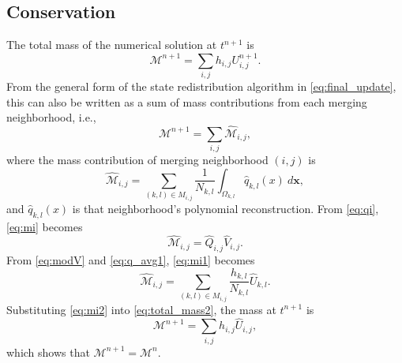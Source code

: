 \subsection{Conservation}\label{sec:cons}
The total mass of the numerical solution at $t^{n+1}$ is
\begin{equation}\label{eq:total_mass}
\mathcal{M}^{n+1} = \sum_{i,j} h_{i,j} U^{n+1}_{i,j}.
\end{equation}
From the general form of the state redistribution algorithm 
in \eqref{eq:final_update}, this can also be written as a sum of mass contributions from each 
merging neighborhood, i.e.,
\begin{equation}\label{eq:total_mass2}
\mathcal{M}^{n+1} = \sum_{i,j} \hat{\mathcal{M}}_{i,j},
\end{equation}
where the mass contribution of merging neighborhood $(i,j)$ is
\begin{equation}\label{eq:mi}
\hat{\mathcal{M}}_{i,j} = \sum_{(k,l) \in M_{i,j}}\frac{1}{N_{k,l}} \int_{\Omega_{k,l}}\hat q_{k,l}(x) ~d\mathbf{x},
\end{equation}
and $\hat q_{k,l}(x)$ is that neighborhood's polynomial reconstruction.  
From \eqref{eq:qi}, \eqref{eq:mi} becomes
\begin{equation}\label{eq:mi1}
\hat{\mathcal{M}}_{i,j} = \hat Q_{i,j} \hat V_{i,j}.
\end{equation}
From \eqref{eq:modV} and \eqref{eq:q_avg1}, \eqref{eq:mi1} becomes
\begin{equation}\label{eq:mi2}
\hat{\mathcal{M}}_{i,j} = \sum_{(k,l) \in M_{i,j} }\frac{h_{k,l}}{N_{k,l}} \hat U_{k,l}.
\end{equation}
Substituting \eqref{eq:mi2} into \eqref{eq:total_mass2}, the mass at $t^{n+1}$ is
$$
\mathcal{M}^{n+1} = \sum_{i,j} h_{i,j} \hat U_{i,j},
$$
which shows that $\mathcal{M}^{n+1}  = \mathcal{M}^{n} $.

	
